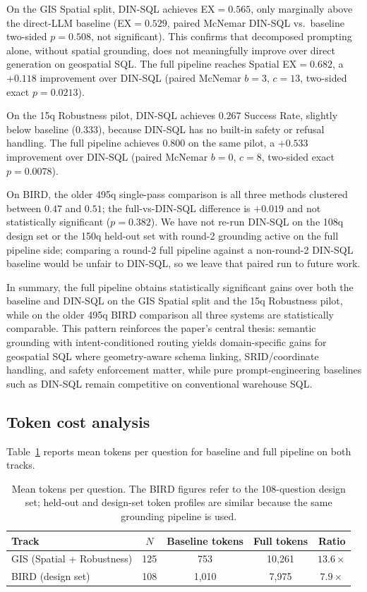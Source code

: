\documentclass[11pt]{article}
\begin{document}
On the GIS Spatial split, DIN-SQL achieves EX$=0.565$, only marginally above the direct-LLM baseline (EX$=0.529$, paired McNemar DIN-SQL vs.\ baseline two-sided $p=0.508$, not significant). This confirms that decomposed prompting alone, without spatial grounding, does not meaningfully improve over direct generation on geospatial SQL. The full pipeline reaches Spatial EX$=0.682$, a $+0.118$ improvement over DIN-SQL (paired McNemar $b=3$, $c=13$, two-sided exact $p=0.0213$).

On the 15q Robustness pilot, DIN-SQL achieves $0.267$ Success Rate, slightly below baseline ($0.333$), because DIN-SQL has no built-in safety or refusal handling. The full pipeline achieves $0.800$ on the same pilot, a $+0.533$ improvement over DIN-SQL (paired McNemar $b=0$, $c=8$, two-sided exact $p=0.0078$).

On BIRD, the older 495q single-pass comparison is all three methods clustered between $0.47$ and $0.51$; the full-vs-DIN-SQL difference is $+0.019$ and not statistically significant ($p=0.382$). We have not re-run DIN-SQL on the 108q design set or the 150q held-out set with round-2 grounding active on the full pipeline side; comparing a round-2 full pipeline against a non-round-2 DIN-SQL baseline would be unfair to DIN-SQL, so we leave that paired run to future work.

In summary, the full pipeline obtains statistically significant gains over both the baseline and DIN-SQL on the GIS Spatial split and the 15q Robustness pilot, while on the older 495q BIRD comparison all three systems are statistically comparable. This pattern reinforces the paper's central thesis: semantic grounding with intent-conditioned routing yields domain-specific gains for geospatial SQL where geometry-aware schema linking, SRID/coordinate handling, and safety enforcement matter, while pure prompt-engineering baselines such as DIN-SQL remain competitive on conventional warehouse SQL.

\subsection{Token cost analysis}
\label{sec:tokens}

Table~\ref{tab:tokens} reports mean tokens per question for baseline and full pipeline on both tracks.

\begin{table}[t]
\centering
\caption{Mean tokens per question. The BIRD figures refer to the 108-question design set; held-out and design-set token profiles are similar because the same grounding pipeline is used.}
\label{tab:tokens}
\begin{tabular}{lcccc}
\toprule
Track & $N$ & Baseline tokens & Full tokens & Ratio \\
\midrule
GIS (Spatial + Robustness)  & 125        & 753   & 10{,}261 & $13.6\times$ \\
BIRD (design set)           & 108        & 1{,}010 & 7{,}975 & $7.9\times$ \\
\bottomrule
\end{tabular}
\end{table}
\end{document}

